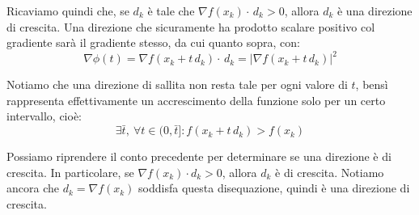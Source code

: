 \documentclass[a4paper,11pt]{article}
\begin{document}
Ricaviamo quindi che, se $d_k$ è tale che $\nabla f(x_k) \cdot \, d_k > 0$, allora $d_k$ è una direzione di crescita.
Una direzione che sicuramente ha prodotto scalare positivo col gradiente sarà il gradiente stesso, da cui quanto sopra, con:
$$
\nabla \phi(t) = \nabla f(x_k + t \, d_k) \cdot \, d_k = |\nabla f(x_k + t \, d_k)|^2
$$

\par\smallskip 

Notiamo che una direzione di sallita non resta tale per ogni valore di $t$, bensì rappresenta effettivamente un accrescimento della funzione solo per un certo intervallo, cioè:
$$
\exists \bar{t}, \ \forall t \in (0, \bar{t}] : f(x_k + t \, d_k) > f(x_k) 
$$

Possiamo riprendere il conto precedente per determinare se una direzione è di crescita.
In particolare, se $ \nabla f(x_k) \cdot d_k > 0$, allora $d_k$ è di crescita.
Notiamo ancora che $d_k = \nabla f(x_k)$ soddisfa questa disequazione, quindi è una direzione di crescita.
\end{document}
